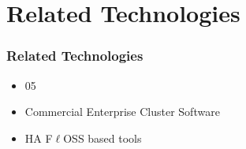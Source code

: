 \section{Related Technologies}

\begin{frame}%
\frametitle{Related Technologies}

\begin{itemize}
  \item 05
  \item Commercial Enterprise Cluster Software
  \item HA F$\ell$OSS based tools
\end{itemize}

\end{frame}